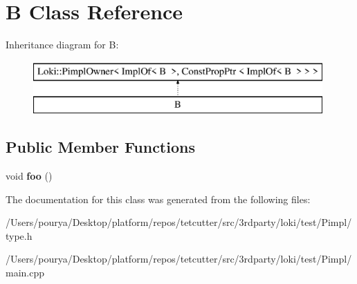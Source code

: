 \hypertarget{classB}{}\section{B Class Reference}
\label{classB}
Inheritance diagram for B\+:\begin{figure}[H]
\begin{center}
\leavevmode
\includegraphics[height=2.000000cm]{classB}
\end{center}
\end{figure}
\subsection*{Public Member Functions}
\begin{DoxyCompactItemize}
\item 
\hypertarget{classB_a24b3163b7134ced3995eef073e04a4c2}{}void {\bfseries foo} ()\label{classB_a24b3163b7134ced3995eef073e04a4c2}

\end{DoxyCompactItemize}


The documentation for this class was generated from the following files\+:\begin{DoxyCompactItemize}
\item 
/\+Users/pourya/\+Desktop/platform/repos/tetcutter/src/3rdparty/loki/test/\+Pimpl/type.\+h\item 
/\+Users/pourya/\+Desktop/platform/repos/tetcutter/src/3rdparty/loki/test/\+Pimpl/main.\+cpp\end{DoxyCompactItemize}
